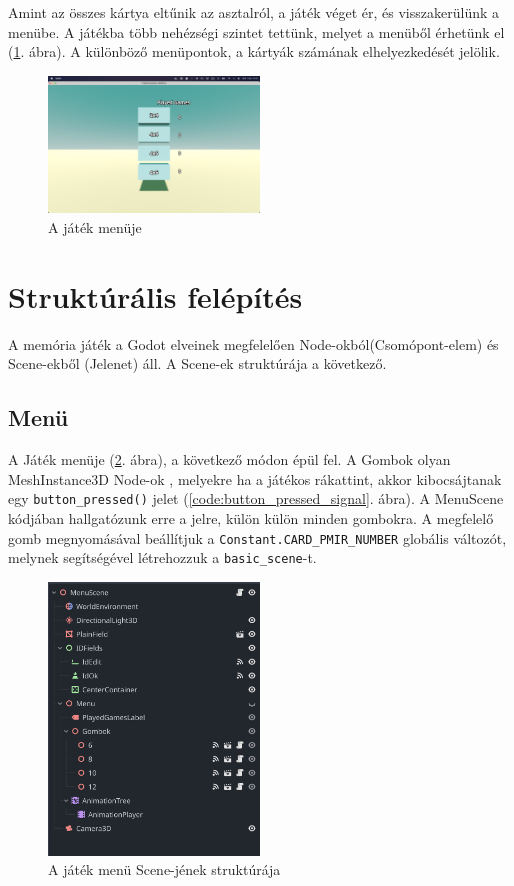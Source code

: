 Amint az összes kártya eltűnik az asztalról, a játék véget ér, és visszakerülünk a menübe.
A játékba több nehézségi szintet tettünk, melyet a menüből érhetünk el (\ref{img:menu}. ábra). A különböző menüpontok, a kártyák számának elhelyezkedését jelölik.
\begin{figure}[h]
    \centering
    \includegraphics[width=0.5\textwidth]{img/menu.png}
    \caption{A játék menüje}
    \label{img:menu}  
\end{figure}

\section{Struktúrális felépítés}
A memória játék a Godot elveinek megfelelően Node-okból(Csomópont-elem) és Scene-ekből (Jelenet) \cite{godotengineNodesScenes} áll. A Scene-ek struktúrája a következő.
\subsection{Menü}


A Játék menüje (\ref{img:menu_scene}. ábra), a következő módon épül fel. A Gombok olyan MeshInstance3D Node-ok \cite{godotengineMeshInstance3D}, melyekre ha a játékos rákattint, akkor kibocsájtanak egy \lstinline{button_pressed()} jelet (\ref{code:button_pressed_signal}. ábra).
A MenuScene kódjában hallgatózunk erre a jelre, külön külön minden gombokra. A megfelelő gomb megnyomásával beállítjuk a \lstinline{Constant.CARD_PMIR_NUMBER} globális változót, melynek segítségével létrehozzuk a \lstinline{basic_scene}-t.
\begin{figure}[h]
    \centering
    \includegraphics[width=0.5\textwidth]{img/menu_scene_tree.png}
    \caption{A játék menü Scene-jének struktúrája}
    \label{img:menu_scene}  
\end{figure}

